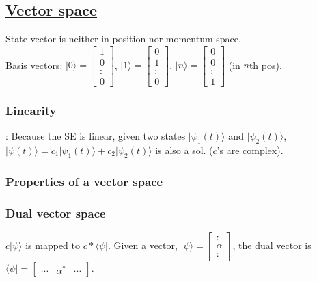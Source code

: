 \subsection{\underline{Vector space}}
State vector is neither in position nor momentum space. \\
Basis vectors:
$|0 \rangle = \begin{bmatrix}
    1 \\
    0 \\
    : \\
    0
    \end{bmatrix}$,
$|1 \rangle = \begin{bmatrix}
    0 \\
    1 \\
    : \\
    0
    \end{bmatrix}$,
$|n \rangle = \begin{bmatrix}
    0 \\
    0 \\
    : \\
    1
\end{bmatrix}$ (in $n$th pos).

    \subsubsection{Linearity}: Because the SE is linear, given two states $|\psi_1(t) \rangle$ and $|\psi_2(t) \rangle$, $|\psi(t) \rangle = c_1 |\psi_1(t) \rangle + c_2|\psi_2(t)\rangle$ is also a sol. ($c$'s are complex).

\subsubsection{Properties of a vector space}

\subsubsection{Dual vector space}
$c|\psi \rangle$ is mapped to $c* \langle \psi |$. Given a vector, $|\psi \rangle = \begin{bmatrix} : \\ \alpha \\ : \end{bmatrix}$, the dual vector is $\langle \psi | = \begin{bmatrix} \cdots & \alpha^* & \cdots \end{bmatrix}$.

